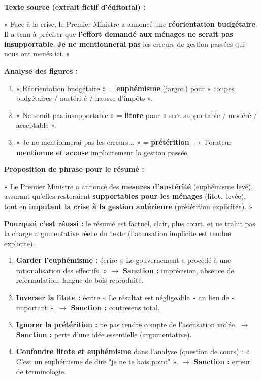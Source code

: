 \documentclass[11pt]{article}
\begin{document}
\begin{exoresolu}
\textbf{Texte source (extrait fictif d'éditorial) :}

« Face à la crise, le Premier Ministre a annoncé une \textbf{réorientation budgétaire}. Il a tenu à préciser que \textbf{l'effort demandé aux ménages ne serait pas insupportable}. \textbf{Je ne mentionnerai pas} les erreurs de gestion passées qui nous ont menés ici. »

\textbf{Analyse des figures :}
\begin{enumerate}
    \item « Réorientation budgétaire » = \textbf{euphémisme} (jargon) pour « coupes budgétaires / austérité / hausse d'impôts ».
    \item « Ne serait pas insupportable » = \textbf{litote} pour « sera supportable / modéré / acceptable ».
    \item « Je ne mentionnerai pas les erreurs... » = \textbf{prétérition} $\rightarrow$ l'orateur \textbf{mentionne et accuse} implicitement la gestion passée.
\end{enumerate}
\tcblower
\textbf{Proposition de phrase pour le résumé :}

« Le Premier Ministre a annoncé des \textbf{mesures d'austérité} (euphémisme levé), assurant qu'elles resteraient \textbf{supportables pour les ménages} (litote levée), tout en \textbf{imputant la crise à la gestion antérieure} (prétérition explicitée). »

\textbf{Pourquoi c'est réussi :} le résumé est factuel, clair, plus court, et ne trahit pas la charge argumentative réelle du texte (l'accusation implicite est rendue explicite).
\end{exoresolu}

\begin{attention}
\begin{enumerate}
    \item \textbf{Garder l'euphémisme :} écrire « Le gouvernement a procédé à une rationalisation des effectifs. » $\rightarrow$ \textbf{Sanction :} imprécision, absence de reformulation, langue de bois reproduite.
    \item \textbf{Inverser la litote :} écrire « Le résultat est négligeable » au lieu de « important ». $\rightarrow$ \textbf{Sanction :} contresens total.
    \item \textbf{Ignorer la prétérition :} ne pas rendre compte de l'accusation voilée. $\rightarrow$ \textbf{Sanction :} perte d'une idée essentielle (argumentative).
    \item \textbf{Confondre litote et euphémisme} dans l'analyse (question de cours) : « C'est un euphémisme de dire "je ne te hais point" ». $\rightarrow$ \textbf{Sanction :} erreur de terminologie.
\end{enumerate}
\end{attention}
\end{document}
